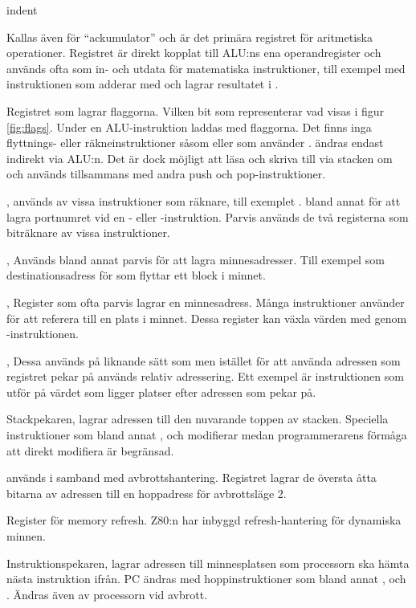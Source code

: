 \documentclass[main.tex]{subfiles}
\begin{document}
\begin{labeling}{indent}
\item[\mono{A}]
    Kallas även för ``ackumulator'' och är det primära registret för
    aritmetiska operationer. Registret är direkt kopplat till ALU:ns ena
    operandregister och används ofta som in- och utdata för matematiska
    instruktioner, till exempel med instruktionen  som adderar
     med  och lagrar resultatet i .
\item[\mono{F}]
    Registret som lagrar flaggorna. Vilken bit som representerar vad visas i
    figur \ref{fig:flags}. Under en ALU-instruktion laddas  med
    flaggorna. Det finns inga flyttnings- eller räkneinstruktioner såsom
     eller  som använder .  ändras endast
    indirekt via ALU:n. Det är dock möjligt att läsa och skriva till 
    via stacken om  och  används tillsammans med
    andra push och pop-instruktioner.
\item[\mono{B}, \mono{C}]
     används av vissa instruktioner som räknare, till exemplet
    .  bland annat för att lagra portnumret vid en
    - eller -instruktion. Parvis används de två registerna
    som biträknare av vissa instruktioner.
\item[\mono{D}, \mono{E}]
    Används bland annat parvis för att lagra minnesadresser. Till exempel som
    destinationsadress för  som flyttar ett block i minnet.
\item[\mono{H}, \mono{L}]
    Register som ofta parvis lagrar en minnesadress. Många instruktioner
    använder  för att referera till en plats i minnet. Dessa register
    kan växla värden med  genom -instruktionen.
\item[\mono{IX}, \mono{IY}]
    Dessa används på liknande sätt som  men istället för att använda
    adressen som registret pekar på används relativ adressering. Ett exempel är
    instruktionen  som utför  på värdet som ligger
     platser efter adressen som  pekar på.
\item[\mono{SP}]
    Stackpekaren, lagrar adressen till den nuvarande toppen av stacken.
    Speciella instruktioner som bland annat ,  och
     modifierar  medan programmerarens förmåga att direkt
    modifiera  är begränsad.
\item[\mono{I}]
     används i samband med avbrottshantering. Registret lagrar de
    översta åtta bitarna av adressen till en hoppadress för avbrottsläge 2.
\item[\mono{R}]
    Register för memory refresh. Z80:n har inbyggd refresh-hantering för
    dynamiska minnen.
\item[\mono{PC}]
    Instruktionspekaren, lagrar adressen till minnesplatsen som processorn ska
    hämta nästa instruktion ifrån. PC ändras med hoppinstruktioner som bland
    annat ,  och . Ändras även av processorn vid
    avbrott.
\end{labeling}
\end{document}
